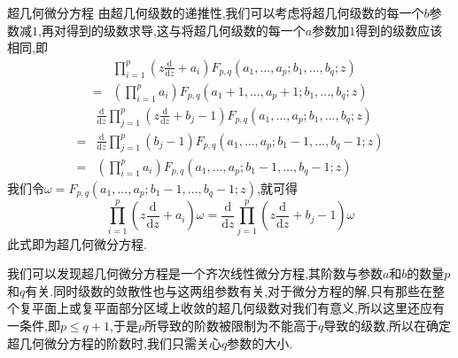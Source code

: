 \documentclass[zihao=-4,a4paper]{ctexart}
\begin{document}
\begin{mdefinition}{超几何微分方程}
	由超几何级数的递推性,我们可以考虑将超几何级数的每一个${b}$参数减$1$,再对得到的级数求导,这与将超几何级数的每一个${a}$参数加$1$得到的级数应该相同,即
	\begin{equation*}
		\begin{split}
			&\prod^{p}_{ {i} = 1 } \left( {z} \frac{ \text{d} }{ \text{d} {z} } + {a}_{i} \right) {F}_{p,q}\left( {a}_{1} , ... , {a}_{p} ; {b}_{1} , ... , {b}_{q} ; {z} \right)\\
			=&\left( {\prod}^{p}_{i=1} {a}_{i} \right) {F}_{p,q}\left( {a}_{1} + {1} , ... , {a}_{p} + {1} ; {b}_{1} , ... , {b}_{q} ; {z} \right)
		\end{split}
	\end{equation*}
	\begin{equation*}
		\begin{split}
			&\frac{ \text{d} }{ \text{d} {z} } \prod^{p}_{ {j} = 1 } \left( {z} \frac{ \text{d} }{ \text{d} {z} } + {b}_{j} - {1} \right) {F}_{p,q}\left( {a}_{1} , ... , {a}_{p} ; {b}_{1} , ... , {b}_{q} ; {z} \right)\\
			=&\frac{ \text{d} }{ \text{d} {z} } \prod^{p}_{ {j} = 1 } \left( {b}_{j} - {1} \right) {F}_{p,q}\left( {a}_{1} , ... , {a}_{p} ; {b}_{1} - {1} , ... , {b}_{q} - {1} ; {z} \right)\\
			=&\left( {\prod}^{p}_{i=1} {a}_{i} \right) {F}_{p,q}\left( {a}_{1} , ... , {a}_{p} ; {b}_{1} - {1} , ... , {b}_{q} - {1} ; {z} \right)
		\end{split}
	\end{equation*}
	我们令${\omega} = {F}_{p,q}\left( {a}_{1} , ... , {a}_{p} ; {b}_{1} - {1} , ... , {b}_{q} - {1} ; {z} \right)$,就可得
	\begin{equation}
		\prod^{p}_{ {i} = 1 } \left( {z} \frac{ \text{d} }{ \text{d} {z} } + {a}_{i} \right) {\omega} = \frac{ \text{d} }{ \text{d} {z} } \prod^{p}_{ {j} = 1 } \left( {z} \frac{ \text{d} }{ \text{d} {z} } + {b}_{j} - {1} \right) {\omega}
	\end{equation}
	此式即为超几何微分方程.

	我们可以发现超几何微分方程是一个齐次线性微分方程,其阶数与参数${a}$和${b}$的数量${p}$和${q}$有关.同时级数的敛散性也与这两组参数有关,对于微分方程的解,只有那些在整个复平面上或复平面部分区域上收敛的超几何级数对我们有意义,所以这里还应有一条件,即$ {p} {\leqslant} {q} + {1} $,于是$p$所导致的阶数被限制为不能高于$q$导致的级数,所以在确定超几何微分方程的阶数时,我们只需关心$q$参数的大小.
\end{mdefinition}
\end{document}
